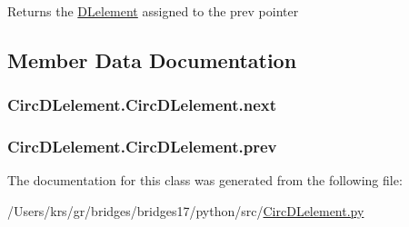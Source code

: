 \begin{DoxyReturn}{Returns}
the \hyperlink{namespace_d_lelement}{D\+Lelement} assigned to the prev pointer 
\end{DoxyReturn}


\subsection{Member Data Documentation}
\hypertarget{class_circ_d_lelement_1_1_circ_d_lelement_a58f067bcf3daa5c7a0e944bc91961af9}{}
\subsubsection[{next}]{\setlength{\rightskip}{0pt plus 5cm}Circ\+D\+Lelement.\+Circ\+D\+Lelement.\+next}\label{class_circ_d_lelement_1_1_circ_d_lelement_a58f067bcf3daa5c7a0e944bc91961af9}
\hypertarget{class_circ_d_lelement_1_1_circ_d_lelement_a71d1419a7eb3687a3351e5ea0bcd55b4}{}
\subsubsection[{prev}]{\setlength{\rightskip}{0pt plus 5cm}Circ\+D\+Lelement.\+Circ\+D\+Lelement.\+prev}\label{class_circ_d_lelement_1_1_circ_d_lelement_a71d1419a7eb3687a3351e5ea0bcd55b4}


The documentation for this class was generated from the following file\+:\begin{DoxyCompactItemize}
\item 
/\+Users/krs/gr/bridges/bridges17/python/src/\hyperlink{_circ_d_lelement_8py}{Circ\+D\+Lelement.\+py}\end{DoxyCompactItemize}
